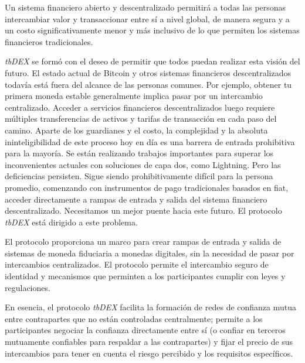 \documentclass[11pt]{article}
\begin{document}
\vspace{1\baselineskip}
Un sistema financiero abierto y descentralizado permitirá a todas las personas intercambiar valor y transaccionar entre sí a nivel global, de manera segura y a un costo significativamente menor y más inclusivo de lo que permiten los sistemas financieros tradicionales.

\vspace{1\baselineskip}
\textit{tbDEX} se formó con el deseo de permitir que todos puedan realizar esta visión del futuro. El estado actual de Bitcoin y otros sistemas financieros descentralizados todavía está fuera del alcance de las personas comunes. Por ejemplo, obtener tu primera moneda estable generalmente implica pasar por un intercambio centralizado. Acceder a servicios financieros descentralizados luego requiere múltiples transferencias de activos y tarifas de transacción en cada paso del camino. Aparte de los guardianes y el costo, la complejidad y la absoluta ininteligibilidad de este proceso hoy en día es una barrera de entrada prohibitiva para la mayoría. Se están realizando trabajos importantes para superar los inconvenientes actuales con soluciones de capa dos, como Lightning. Pero las deficiencias persisten. Sigue siendo prohibitivamente difícil para la persona promedio, comenzando con instrumentos de pago tradicionales basados en fiat, acceder directamente a rampas de entrada y salida del sistema financiero descentralizado. Necesitamos un mejor puente hacia este futuro. El protocolo \textit{tbDEX} está dirigido a este problema.

\vspace{1\baselineskip}
El protocolo proporciona un marco para crear rampas de entrada y salida de sistemas de moneda fiduciaria a monedas digitales, sin la necesidad de pasar por intercambios centralizados. El protocolo permite el intercambio seguro de identidad y mecanismos que perminten a los participantes cumplir con leyes y regulaciones. 

\vspace{1\baselineskip}
En esencia, el protocolo \textit{tbDEX} facilita la formación de redes de confianza mutua entre contrapartes que no están controladas centralmente; permite a los participantes negociar la confianza directamente entre sí (o confiar en terceros mutuamente confiables para respaldar a las contrapartes) y fijar el precio de sus intercambios para tener en cuenta el riesgo percibido y los requisitos específicos. 

\vspace{1\baselineskip}
\end{document}
